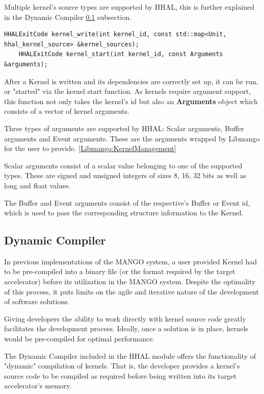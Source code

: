 Multiple kernel's source types are supported by HHAL, this is further explained in the Dynamic Compiler \ref{HHAL:DynamicCompiler} subsection.

\begin{lstlisting}[style=CStyle, caption=HHAL API - Kernel actions]
    HHALExitCode kernel_write(int kernel_id, const std::map<Unit, hhal_kernel_source> &kernel_sources);
    HHALExitCode kernel_start(int kernel_id, const Arguments &arguments);
\end{lstlisting}

After a Kernel is written and its dependencies are correctly set up, it can be run, or "started" via the kernel start function. As kernels require argument support, this function not only takes the kernel's id but also an \textbf{Arguments} object which consists of a vector of kernel arguments.

Three types of arguments are supported by HHAL: Scalar arguments, Buffer arguments and Event arguments. These are the arguments wrapped by Libmango for the user to provide. \ref{Libmango:KernelManagement} 

Scalar arguments consist of a scalar value belonging to one of the supported types. These are signed and unsigned integers of sizes 8, 16, 32 bits as well as long and float values. 

The Buffer and Event arguments consist of the respective's Buffer or Event id, which is used to pass the corresponding structure information to the Kernel.

\subsection{Dynamic Compiler} \label{HHAL:DynamicCompiler}

In previous implementations of the MANGO system, a user provided Kernel had to be pre-compiled into a binary file (or the format required by the target accelerator) before its utilization in the MANGO system. Despite the optimality of this process, it puts limits on the agile and iterative nature of the development of software solutions.

Giving developers the ability to work directly with kernel source code greatly facilitates the development process. Ideally, once a solution is in place, kernels would be pre-compiled for optimal performance.

The Dynamic Compiler included in the HHAL module offers the functionality of "dynamic" compilation of kernels. That is, the developer provides a kernel's source code to be compiled as required before being written into its target accelerator's memory.


